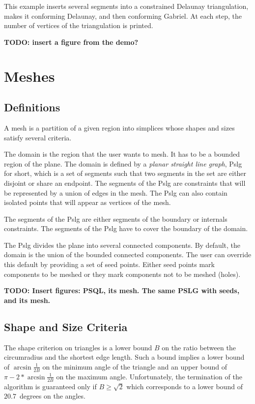 This example inserts several segments into a constrained Delaunay
triangulation, makes it conforming Delaunay, and then conforming
Gabriel. At each step, the number of vertices of the triangulation is
printed.


\textbf{TODO: insert a figure from the demo?}

\section{Meshes}
\label{sec:Mesh_2_meshes}


\subsection{Definitions}
\label{sec:Mesh_2_meshes_definition}

A mesh is a partition of a given region into simplices whose shapes
and sizes satisfy several criteria.

The domain is the region that the user wants to mesh. It has to be
  a bounded region of the plane. The domain is defined by a \emph{planar
  straight line graph}, {\sc Pslg} for short, which is a set of segments
  such that two segments in the set are either disjoint or share an
  endpoint. The segments of the {\sc Pslg} are constraints that will be
  represented by a union of edges in the mesh. The {\sc Pslg} can also
  contain isolated points that will appear as vertices of the mesh.

The segments of the {\sc Pslg} are either segments of the
boundary or internals constraints. The segments of the {\sc Pslg} have to
cover the boundary of the domain.

The {\sc Pslg} divides the plane into several connected components. By
default, the domain is the union of the bounded connected components. The
user can override this default by providing a set of seed points. Either
seed points mark components to be meshed or they mark components not to be
meshed (holes).

\textbf{TODO: Insert figures: PSQL, its mesh. The same PSLG with seeds, and
its mesh.}

\subsection{Shape and Size Criteria}
\label{sec:Mesh_2_criteria}

The shape criterion on triangles is a lower bound $B$ on the ratio
between the circumradius and the shortest edge length.  Such a bound
implies a lower bound of $\arcsin{\frac{1}{2B}}$ on the minimum angle
of the triangle and an upper bound of $\pi - 2* \arcsin{\frac{1}{2B}}$
on the maximum angle.  Unfortunately, the termination of the algorithm
is guaranteed only if $B \ge \sqrt{2}$ which corresponds to a lower
bound of $20.7$~degrees on the angles.

